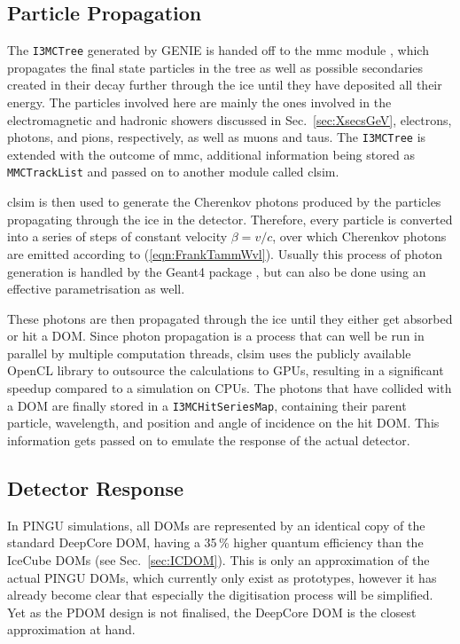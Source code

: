 \subsection{Particle Propagation}
\label{sec:MC_propagation}

The \texttt{I3MCTree} generated by GENIE is handed off to the mmc module
\cite{mmc}, which propagates the final state particles in the tree as well as
possible secondaries created in their decay further through the ice until they
have deposited all their energy. The particles involved here are mainly the
ones involved in the electromagnetic and hadronic showers discussed in
Sec.~\ref{sec:XsecsGeV}, \ie electrons, photons, and pions, respectively, as
well as muons and taus. The \texttt{I3MCTree} is extended with the outcome of
mmc, additional information being stored as \texttt{MMCTrackList} and passed on
to another module called clsim.

clsim \cite{clsim} is then used to generate the Cherenkov photons produced by
the particles propagating through the ice in the detector. Therefore, every
particle is converted into a series of steps of constant velocity $\beta =
v/c$, over which Cherenkov photons are emitted according to
(\ref{eqn:FrankTammWvl}). Usually this process of photon generation is handled
by the Geant4 package \cite{Geant4_1, Geant4_2}, but can also be done using an
effective parametrisation as well.

These photons are then propagated through the ice until they either get absorbed
or hit a DOM. Since photon propagation is a process that can well be run in 
parallel by multiple computation threads, clsim uses the publicly available
OpenCL library \cite{OpenCL} to outsource the calculations to GPUs, resulting
in a significant speedup compared to a simulation on CPUs. The photons that
have collided with a DOM are finally stored in a \texttt{I3MCHitSeriesMap},
containing their parent particle, wavelength, and position and angle of
incidence on the hit DOM. This information gets passed on to emulate the
response of the actual detector.

\subsection{Detector Response}
\label{sec:MC_detector}

In PINGU simulations, all DOMs are represented by an identical copy of the
standard DeepCore DOM, having a 35\,\% higher quantum efficiency than the
IceCube DOMs (see Sec.~\ref{sec:ICDOM}). This is only an approximation of the
actual PINGU DOMs, which currently only exist as prototypes, however it has
already become clear that especially the digitisation process will be
simplified. Yet as the PDOM design is not finalised, the DeepCore DOM is the
closest approximation at hand.

